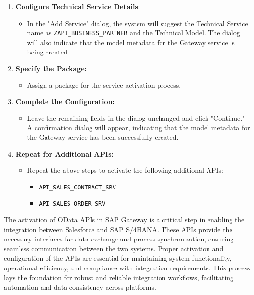 \begin{enumerate}
    \item \textbf{Configure Technical Service Details:}
    \begin{itemize}
        \item In the "Add Service" dialog, the system will suggest the Technical Service name as \texttt{ZAPI\_BUSINESS\_PARTNER} and the Technical Model. The dialog will also indicate that the model metadata for the Gateway service is being created.
    \end{itemize}

    \item \textbf{Specify the Package:}
    \begin{itemize}
        \item Assign a package for the service activation process.
    \end{itemize}

    \item \textbf{Complete the Configuration:}
    \begin{itemize}
        \item Leave the remaining fields in the dialog unchanged and click "Continue." A confirmation dialog will appear, indicating that the model metadata for the Gateway service has been successfully created.
    \end{itemize}

    \item \textbf{Repeat for Additional APIs:}
    \begin{itemize}
        \item Repeat the above steps to activate the following additional APIs:
        \begin{itemize}
            \item \texttt{API\_SALES\_CONTRACT\_SRV}
            \item \texttt{API\_SALES\_ORDER\_SRV}
        \end{itemize}
    \end{itemize}
\end{enumerate}


The activation of OData APIs in SAP Gateway is a critical step in enabling the integration between Salesforce and SAP S/4HANA. These APIs provide the necessary interfaces for data exchange and process synchronization, ensuring seamless communication between the two systems. Proper activation and configuration of the APIs are essential for maintaining system functionality, operational efficiency, and compliance with integration requirements. This process lays the foundation for robust and reliable integration workflows, facilitating automation and data consistency across platforms.



